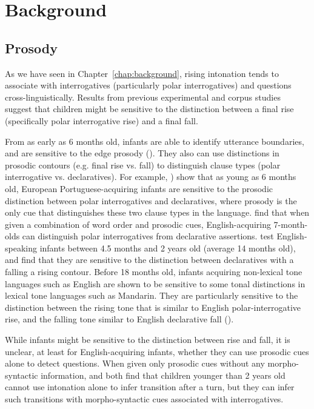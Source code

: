 \section{Background}
\label{sec:engsp:background}
\subsection{Prosody}
\label{sec:engsp:bg:prosody}
As we have seen in Chapter~\ref{chap:background}, rising intonation tends to associate with interrogatives (particularly polar interrogatives) and questions cross-linguistically. Results from previous experimental and corpus studies suggest that children might be sensitive to the distinction between a final rise (specifically polar interrogative rise) and a final fall. 

From as early as 6 months old, infants are able to identify utterance boundaries, and are sensitive to the edge prosody (\cite{johnson2014edge}). They also can use distinctions in prosodic contours (e.g. final rise vs. fall) to distinguish clause types (polar interrogative vs. declaratives). For example, \textcite{frota2014}) show that as young as 6 months old, European Portuguese-acquiring infants are sensitive to the prosodic distinction between polar interrogatives and declaratives, where prosody is the only cue that distinguishes these two clause types in the language. \textcite{geffenmintz2011} find that when given a combination of word order and prosodic cues, English-acquiring 7-month-olds can distinguish polar interrogatives from declarative assertions. \textcite{soderstrom2005clause} test English-speaking infants between 4.5 months and 2 years old (average 14 months old), and find that they are sensitive to the distinction between declaratives with a falling a rising contour. Before 18 months old, infants acquiring non-lexical tone languages such as English are shown to be sensitive to some tonal distinctions in lexical tone languages such as Mandarin. They are particularly sensitive to the distinction between the rising tone that is similar to English polar-interrogative rise, and the falling tone similar to English declarative fall (\cite{shi2017tone, Hay2019}).%

While infants might be sensitive to the distinction between rise and fall, it is unclear, at least for English-acquiring infants, whether they can use prosodic cues alone to detect questions. When given only prosodic cues without any morpho-syntactic information, \textcite{keitel2013turn} and \textcite{casillas2017turn} both find that children younger than 2 years old cannot use intonation alone to infer transition after a turn, but they can infer such transitions with morpho-syntactic cues associated with interrogatives. 

